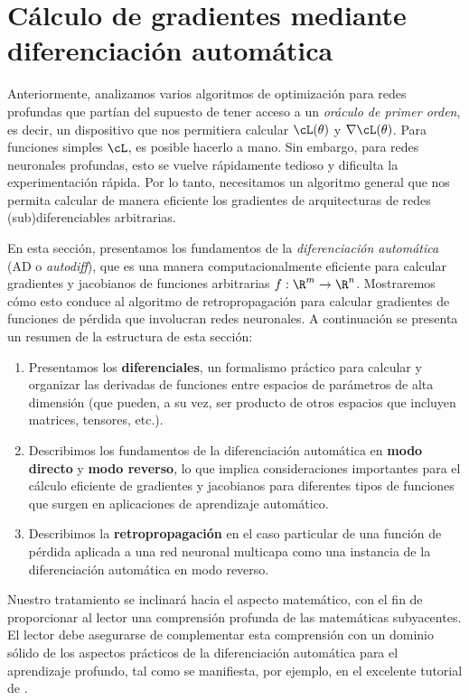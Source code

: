 \documentclass[../../book-main_es.tex]{subfiles}
\begin{document}
\section{Cálculo de gradientes mediante diferenciación automática}\label{sec:autodiff}

Anteriormente, analizamos varios algoritmos de optimización para redes profundas
que partían del supuesto de tener acceso a un \textit{oráculo de primer orden}, es decir, un dispositivo
que nos permitiera calcular \(\cL(\theta)\) y \(\nabla
\cL(\theta)\). Para funciones simples \(\cL\), es posible hacerlo
a mano. Sin embargo, para redes neuronales profundas, esto se vuelve rápidamente
tedioso y dificulta la experimentación rápida. Por lo tanto, necesitamos un
algoritmo general que nos permita calcular de manera eficiente los
gradientes de arquitecturas de redes (sub)diferenciables arbitrarias.

En esta sección, presentamos los fundamentos de la \textit{diferenciación automática} (AD o \textit{autodiff}), que es una
manera computacionalmente eficiente para calcular gradientes y jacobianos de
funciones arbitrarias \(f: \R^{m} \to \R^{n}\). Mostraremos cómo esto
conduce al algoritmo de retropropagación para calcular gradientes de
funciones de pérdida que involucran redes neuronales. A continuación se presenta un resumen de la estructura
de esta sección:
\begin{enumerate}
    \item Presentamos los \textbf{diferenciales}, un formalismo práctico
        para calcular y organizar las derivadas de funciones
        entre espacios de parámetros de alta dimensión (que pueden, a su vez,
            ser producto de otros espacios que incluyen matrices,
        tensores, etc.).
    \item Describimos los fundamentos de la diferenciación automática en \textbf{modo directo} y
        \textbf{modo reverso}, lo que
        implica consideraciones importantes para el cálculo eficiente
        de gradientes y jacobianos para diferentes tipos de
        funciones que surgen en aplicaciones de aprendizaje automático.
    \item Describimos la \textbf{retropropagación} en el caso particular de
        una función de pérdida aplicada a una red neuronal multicapa 
        como una instancia de la diferenciación automática en modo reverso.
\end{enumerate}

Nuestro tratamiento se inclinará hacia el aspecto matemático, con el fin de proporcionar al lector una
comprensión profunda de las matemáticas subyacentes. El lector debe
asegurarse de complementar esta comprensión con un dominio sólido de los aspectos prácticos
de la diferenciación automática para el aprendizaje profundo, tal como se
manifiesta, por ejemplo, en el excelente tutorial de \textcite{karpathy-micrograd}.
\end{document}
